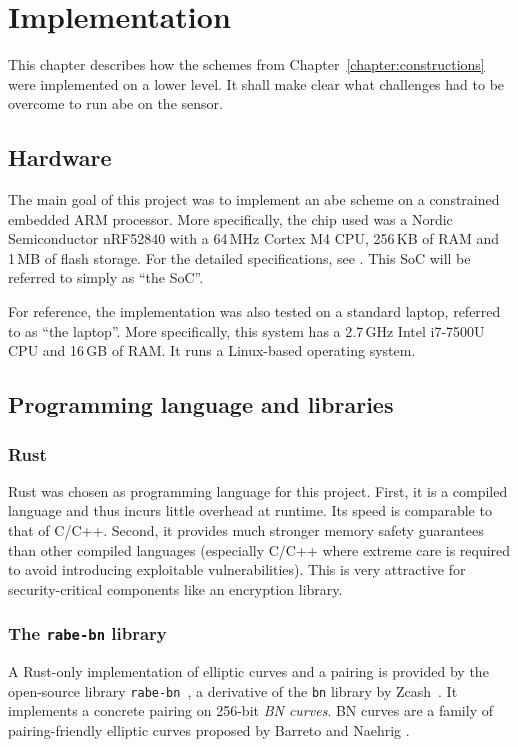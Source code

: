 \chapter{Implementation}

This chapter describes how the schemes from Chapter~\ref{chapter:constructions} were implemented on a lower level.
It shall make clear what challenges had to be overcome to run \acrshort{abe} on the sensor.

\section{Hardware}

The main goal of this project was to implement an \acrshort{abe} scheme on a constrained embedded ARM processor.
More specifically, the chip used was a Nordic Semiconductor nRF52840 with a 64\,MHz Cortex M4 CPU, 256\,KB of RAM and 1\,MB of flash storage.
For the detailed specifications, see \cite{nordic_semiconductor_nrf52840_nodate}.
This SoC will be referred to simply as ``the SoC''.

For reference, the implementation was also tested on a standard laptop, referred to as ``the laptop''.
More specifically, this system has a 2.7\,GHz Intel i7-7500U CPU and 16\,GB of RAM.
It runs a Linux-based operating system.

\section{Programming language and libraries}

\subsection*{Rust}

Rust was chosen as programming language for this project.
First, it is a compiled language and thus incurs little overhead at runtime. Its speed is comparable to that of C/C++.
Second, it provides much stronger memory safety guarantees than other compiled languages (especially C/C++ where extreme care is required to avoid introducing exploitable vulnerabilities).
This is very attractive for security-critical components like an encryption library.

\subsection*{The \texttt{rabe-bn} library}

A Rust-only implementation of elliptic curves and a pairing is provided by the open-source library \texttt{rabe-bn}~\cite{bowe_rabe-bn_nodate}, a derivative of the \texttt{bn} library by Zcash~\cite{bowe_bn_2016}.
It implements a concrete pairing on 256-bit \emph{BN curves}.
BN curves are a family of pairing-friendly elliptic curves proposed by Barreto and Naehrig \cite{barreto_pairing-friendly_2006}.

